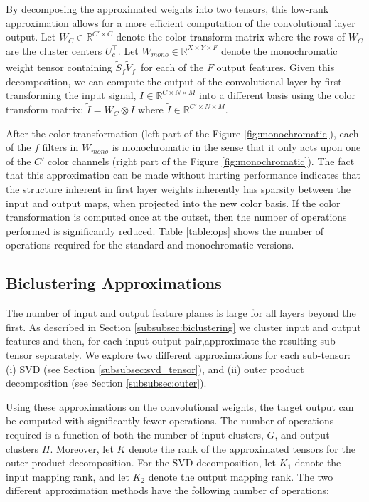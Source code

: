 By decomposing the approximated weights into two tensors, this low-rank approximation
 allows for a more efficient computation of the convolutional layer output. 
 Let $W_C \in \mathbb{R}^{C' \times C}$ denote the color transform matrix 
 where the rows of $W_C$ are the cluster centers $U_c^{\top}$. 
 Let $W_{mono} \in \mathbb{R}^{X \times Y \times F}$ denote the monochromatic 
 weight tensor containing $ \tilde{S}_f \tilde{V}_f^{\top}$ for each of the $F$ output features. 
 Given this decomposition, we can compute the output of the convolutional layer by first 
 transforming the input signal, $I \in \mathbb{R}^{C \times N \times M}$ into a different 
 basis using the color transform matrix: $\tilde{I} = W_C \otimes I$
 where $\tilde{I} \in \mathbb{R}^{C' \times N \times M}$. 

After the color transformation (left part of the Figure \ref{fig:monochromatic}), 
each of the $f$ filters in $W_{mono}$ is monochromatic in the sense that it only acts upon one of the $C'$ color channels 
(right part of the Figure \ref{fig:monochromatic}). 
The fact that this approximation can be made without hurting performance indicates that the 
structure inherent in first layer weights inherently has sparsity
between the input and output maps, when projected into the new color basis. 
If the color transformation is computed once at the outset, then the
number of operations performed is significantly reduced. Table \ref{table:ops} shows the number of operations required for the standard and monochromatic versions.

\subsection{Biclustering Approximations}
The number of  input and output feature planes is large for all layers
beyond the first. As described in Section
\ref{subsubsec:biclustering} we cluster input and output features and then, for each input-output pair,approximate the resulting sub-tensor separately. We explore two different approximations
for each sub-tensor: (i) SVD (see Section \ref{subsubsec:svd_tensor}),
and (ii) outer product decomposition (see Section \ref{subsubsec:outer}).

Using these approximations on the convolutional weights, the target
output can be computed with significantly fewer operations. The number
of operations required is a function of both the number
of input clusters, $G$, and output clusters $H$.  Moreover, let $K$ denote the
rank of the approximated tensors for the outer product decomposition.
For the SVD decomposition, let $K_1$ denote the input mapping rank, and let $K_2$ denote the output mapping rank. The two different approximation methods have the following number of
operations:

